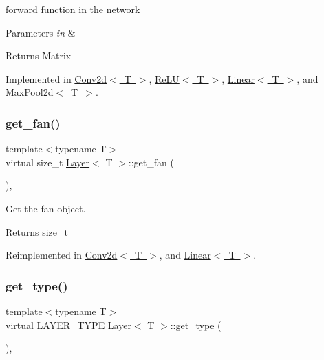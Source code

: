 forward function in the network 


\begin{DoxyParams}{Parameters}
{\em in} & \\
\hline
\end{DoxyParams}
\begin{DoxyReturn}{Returns}
Matrix 
\end{DoxyReturn}


Implemented in \mbox{\hyperlink{class_conv2d_ab795f6a1cabcfedfb2fcb55c9389c2fe}{Conv2d$<$ T $>$}}, \mbox{\hyperlink{class_re_l_u_aef903f5e7d309e76f49abc34043354ce}{Re\+L\+U$<$ T $>$}}, \mbox{\hyperlink{class_linear_a901668e9219a8d446b2ac60718b9c9f1}{Linear$<$ T $>$}}, and \mbox{\hyperlink{class_max_pool2d_a424de7878c64a058a8549362dae448f0}{Max\+Pool2d$<$ T $>$}}.

\mbox{\label{class_layer_a43681206a2ef690667c41423b6b6f20b}} 
\subsubsection{\texorpdfstring{get\_fan()}{get\_fan()}}
{\footnotesize\ttfamily template$<$typename T$>$ \\
virtual size\+\_\+t \mbox{\hyperlink{class_layer}{Layer}}$<$ T $>$\+::get\+\_\+fan (\begin{DoxyParamCaption}{ }\end{DoxyParamCaption})\hspace{0.3cm}{\ttfamily [inline]}, {\ttfamily [virtual]}}



Get the fan object. 

\begin{DoxyReturn}{Returns}
size\+\_\+t 
\end{DoxyReturn}


Reimplemented in \mbox{\hyperlink{class_conv2d_a6eeedff6c4d0864a4c3788e06e82a2e4}{Conv2d$<$ T $>$}}, and \mbox{\hyperlink{class_linear_a753a7cb02a0b18e8922d23db905eb534}{Linear$<$ T $>$}}.

\mbox{\label{class_layer_a9a59bb1bd6e1880abc71d9afbfb96496}} 
\subsubsection{\texorpdfstring{get\_type()}{get\_type()}}
{\footnotesize\ttfamily template$<$typename T$>$ \\
virtual \mbox{\hyperlink{layer__base_8hpp_a5f7e99058765b058df158c099200b154}{L\+A\+Y\+E\+R\+\_\+\+T\+Y\+PE}} \mbox{\hyperlink{class_layer}{Layer}}$<$ T $>$\+::get\+\_\+type (\begin{DoxyParamCaption}{ }\end{DoxyParamCaption})\hspace{0.3cm}{\ttfamily [inline]}, {\ttfamily [virtual]}}



